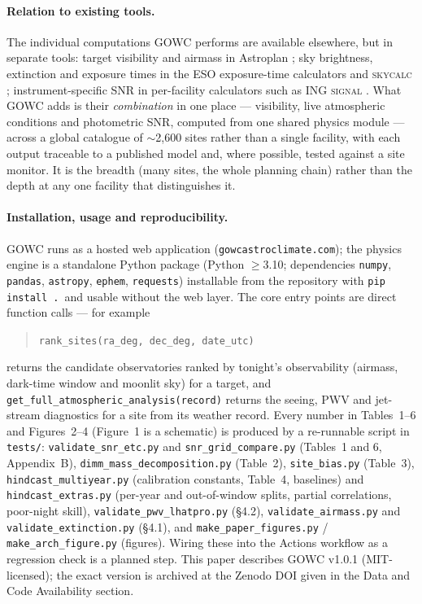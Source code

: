 \documentclass[11pt]{article}
\begin{document}
\paragraph{Relation to existing tools.} The individual computations GOWC performs
are available elsewhere, but in separate tools: target visibility and airmass in
Astroplan \cite{astroplan}; sky brightness, extinction and exposure times in the
ESO exposure-time calculators and \textsc{skycalc} \cite{skycalc}; instrument-specific
SNR in per-facility calculators such as ING \textsc{signal} \cite{signal}. What GOWC
adds is their \emph{combination} in one place --- visibility, live atmospheric
conditions and photometric SNR, computed from one shared physics module --- across a
global catalogue of $\sim$2{,}600 sites rather than a single facility, with each
output traceable to a published model and, where possible, tested against a site
monitor. It is the breadth (many sites, the whole planning chain) rather than the
depth at any one facility that distinguishes it.

\paragraph{Installation, usage and reproducibility.} GOWC runs as a hosted web
application (\texttt{gowcastroclimate.com}); the physics engine is a standalone
Python package (Python $\ge$3.10; dependencies \texttt{numpy}, \texttt{pandas},
\texttt{astropy}, \texttt{ephem}, \texttt{requests}) installable from the repository
with \texttt{pip install .}\ and usable without the web layer. The core entry points
are direct function calls --- for example
\begin{quote}\small\texttt{rank\_sites(ra\_deg, dec\_deg, date\_utc)}\end{quote}
returns the candidate observatories ranked by tonight's observability (airmass,
dark-time window and moonlit sky) for a target, and
\texttt{get\_full\_atmospheric\_analysis(record)} returns the seeing, PWV and
jet-stream diagnostics for a site from its weather record. Every number in
Tables~1--6 and Figures~2--4 (Figure~1 is a schematic) is produced by a re-runnable
script in \texttt{tests/}: \texttt{validate\_\allowbreak snr\_\allowbreak etc.py} and
\texttt{snr\_\allowbreak grid\_\allowbreak compare.py} (Tables~1 and 6, Appendix~B),
\texttt{dimm\_\allowbreak mass\_\allowbreak decomposition.py} (Table~2),
\texttt{site\_\allowbreak bias.py} (Table~3),
\texttt{hindcast\_\allowbreak multiyear.py} (calibration constants, Table~4,
baselines) and \texttt{hindcast\_\allowbreak extras.py} (per-year and
out-of-window splits, partial correlations, poor-night skill),
\texttt{validate\_\allowbreak pwv\_\allowbreak lhatpro.py} (\S4.2),
\texttt{validate\_airmass.py} and \texttt{validate\_extinction.py} (\S4.1), and
\texttt{make\_\allowbreak paper\_\allowbreak figures.py} /
\texttt{make\_\allowbreak arch\_\allowbreak figure.py} (figures). Wiring these into the
Actions workflow as a regression check is a planned step. This paper describes GOWC
v1.0.1 (MIT-licensed); the exact version is archived at the Zenodo DOI given in the Data
and Code Availability section.
\end{document}
